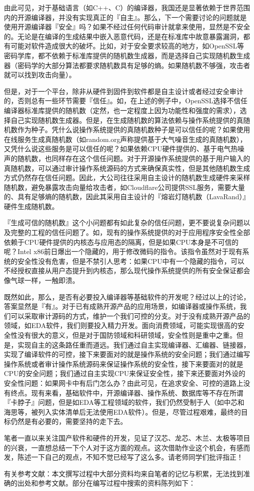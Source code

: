 \documentclass{ctexart}
\begin{document}
由此可见，对于基础语言（如C++、C）的编译器，我国还是显著依赖于世界范围内的开源编译器，并没有实现真正的『自主』。那么，下一个需要讨论的问题就是使用开源编译器『安全』吗？如果不经过任何代码审计就拿来使用，显然是不安全的。无论是在编译的生成结果中嵌入恶意代码，还是在标准库中故意暴露漏洞，都有可能对软件造成很大的破坏。比如，对于安全要求较高的地方，如OpenSSL等密码学库，都不依赖于标准库提供的随机数生成器，而是选择自己实现随机数生成器（密码学的大部分算法都要求随机数具有足够的熵。如果随机数不够强，攻击者就可以找到攻击向量）。 

但是，对于一个平台，除非从硬件到固件到软件都是自主设计或者经过安全审计的，否则总有一些环节需要『信任』。如，在上述的例子中，OpenSSL选择不信任编译器标准库提供的随机数（定然，也一定程度上因为功能性和强度的需求），选择自己实现随机数生成器。但是，在生成随机数的算法依赖与操作系统提供的真随机数作为种子。凭什么说操作系统提供的真随机数种子是可以信任的呢？如果使用在线服务生成真随机数（如random.org声称提供基于大气噪音生成的真随机数），又凭什么说这些服务是可以信任的呢？如果依赖CPU硬件提供的、基于电气热噪声的随机数，也同样存在这个信任问题。对于开源操作系统提供的基于用户输入的真随机数，可以通过审计操作系统源码的方式来确保真实性，但是其他随机数生成方式仍然存在信任问题。因此，大公司往往采用自主设计的随机数生成硬件来采样随机数，避免暴露攻击向量给攻击者，如Cloudflare公司提供SSL服务，需要大量的、具有足够熵的随机数，因此其采用自主设计的『熔岩灯随机数（LavaRand）』\cite{Randomne57:online}硬件生成随机数。

『生成可信的随机数』这个小问题都有如此复杂的信任问题，更不要说复杂问题以及完整的工程的信任问题了。如，现有的操作系统提供的对于应用程序安全性全部依赖于CPU硬件提供的内核态与应用态的隔离，但是如果CPU本身是不可信的呢？Intel x86前日爆出一个隐藏的，用于修改微码的指令\cite{Undocume74:online}。该指令虽然对于现有系统的安全性没有危害，但是不禁引人思考：如果CPU中有一个隐藏的指令，可以不经授权直接从用户态提升到内核态，那么现代操作系统提供的所有安全保证都会像气球一样，一触即溃。

既然如此，那么，是否有必要投入编译器等基础软件的开发呢？经过以上的讨论，答案显然是『有』。对于已有成熟开源产品的应用场景，如编译器或操作系统，我们可以采取审计源码的方式，维护一个我们可控的分支。对于没有成熟开源产品的领域，如EDA软件，我们则要投入精力开发。面向消费领域，可能实现很高的安全性没有很大的意义，但是对于国防领域和科研领域，安全性则是重中之重。但是，实现自主的这条路任重而道远。我们通过自主实现编译器、汇编器、链接器，实现了编译软件的可控，接下来要面对的就是操作系统的安全问题；我们通过编写操作系统或者审计操作系统源码来保证操作系统的安全性，接下来要面对的就是CPU的安全问题；我们通过自主实现CPU来保证安全性，接下来还要面对外设的安全性问题：如果网卡中有后门怎么办？由此可见，在追求安全、可控的道路上没有终点。现有来看，基础软件中，开源编译器、操作系统、数据库等不存在所谓『卡脖子』问题，但是如EDA等工程领域的软件，我们仍然受制于人（如中芯和海思等，被列入实体清单后无法使用EDA软件）。但是，尽管过程艰难，最终的目标仍然是有必要的，需要坚持的走下去。

笔者一直以来关注国产软件和硬件的开发，见证了汉芯、龙芯、木兰、太极等项目的兴衰，一直想总结一下个人对于这方面的观点。这次借助作业这个机会，有感而发，陈述一下自己的观点，不知不觉已经写了这么多。请老师同学们批评指正！

有关参考文献：本文撰写过程中大部分资料均来自笔者的记忆与积累，无法找到准确的出处和参考文献。部分在编写过程中搜索的资料陈列如下：


\end{document}
